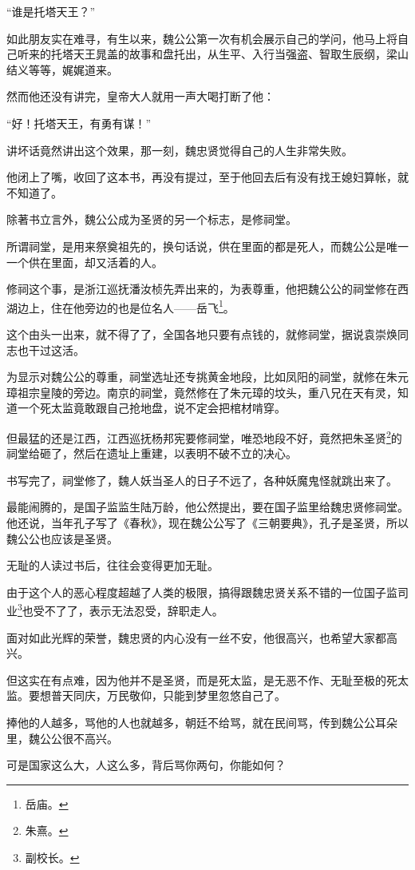 \begin{multicols}{\theparacolNo}
“谁是托塔天王？”

如此朋友实在难寻，有生以来，魏公公第一次有机会展示自己的学问，他马上将自己听来的托塔天王晁盖的故事和盘托出，从生平、入行当强盗、智取生辰纲，梁山结义等等，娓娓道来。

然而他还没有讲完，皇帝大人就用一声大喝打断了他：

“好！托塔天王，有勇有谋！”

讲坏话竟然讲出这个效果，那一刻，魏忠贤觉得自己的人生非常失败。

他闭上了嘴，收回了这本书，再没有提过，至于他回去后有没有找王媳妇算帐，就不知道了。

除著书立言外，魏公公成为圣贤的另一个标志，是修祠堂。

所谓祠堂，是用来祭奠祖先的，换句话说，供在里面的都是死人，而魏公公是唯一一个供在里面，却又活着的人。

修祠这个事，是浙江巡抚潘汝桢先弄出来的，为表尊重，他把魏公公的祠堂修在西湖边上，住在他旁边的也是位名人——岳飞\footnote{岳庙。}。

这个由头一出来，就不得了了，全国各地只要有点钱的，就修祠堂，据说袁崇焕同志也干过这活。

为显示对魏公公的尊重，祠堂选址还专挑黄金地段，比如凤阳的祠堂，就修在朱元璋祖宗皇陵的旁边。南京的祠堂，竟然修在了朱元璋的坟头，重八兄在天有灵，知道一个死太监竟敢跟自己抢地盘，说不定会把棺材啃穿。

但最猛的还是江西，江西巡抚杨邦宪要修祠堂，唯恐地段不好，竟然把朱圣贤\footnote{朱熹。}的祠堂给砸了，然后在遗址上重建，以表明不破不立的决心。

书写完了，祠堂修了，魏人妖当圣人的日子不远了，各种妖魔鬼怪就跳出来了。

最能闹腾的，是国子监监生陆万龄，他公然提出，要在国子监里给魏忠贤修祠堂。他还说，当年孔子写了《春秋》，现在魏公公写了《三朝要典》，孔子是圣贤，所以魏公公也应该是圣贤。

无耻的人读过书后，往往会变得更加无耻。

由于这个人的恶心程度超越了人类的极限，搞得跟魏忠贤关系不错的一位国子监司业\footnote{副校长。}也受不了了，表示无法忍受，辞职走人。

面对如此光辉的荣誉，魏忠贤的内心没有一丝不安，他很高兴，也希望大家都高兴。

但这实在有点难，因为他并不是圣贤，而是死太监，是无恶不作、无耻至极的死太监。要想普天同庆，万民敬仰，只能到梦里忽悠自己了。

捧他的人越多，骂他的人也就越多，朝廷不给骂，就在民间骂，传到魏公公耳朵里，魏公公很不高兴。

可是国家这么大，人这么多，背后骂你两句，你能如何？


\end{multicols}
